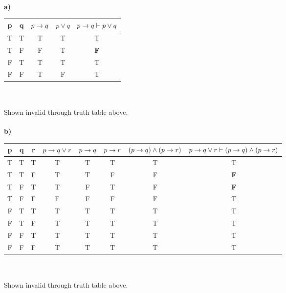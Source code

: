 \documentclass[12pt,oneside,reqno]{amsart}
\begin{document}
\textbf{a)}\\
	\begin{tabular}{ cc|c|c|c }
		p & q & $p \rightarrow{} q$ & $p \lor q$ & $p \rightarrow{} q \vdash p \lor q$ \\ \hline
		T & T & 	T & T & T \\
		T & F & 	F & T & \textbf{F} \\
		F & T & 	T & T & T \\
		F & F & 	T & F & T \\
	\end{tabular}\\\\
	Shown invalid through truth table above.\\\\

\textbf{b)}\\
	\begin{tabular}{ ccc|c|c|c|c|c }
		p & q & r & $p \rightarrow{} q \lor r$ & $p \rightarrow{} q$ & $p \rightarrow{} r$ & $(p \rightarrow{} q) \land (p \rightarrow{} r)$ & $p \rightarrow{} q \lor r \vdash (p \rightarrow{} q) \land (p \rightarrow{} r)$  \\ \hline
		T & T & T &	 T & T & T & T & T \\
		T & T & F &	 T & T & F & F & \textbf{F} \\
		T & F & T &	 T & F & T & F & \textbf{F} \\
		T & F & F &	 F & F & F & F & T \\
		F & T & T &	 T & T & T & T & T \\
		F & T & F &	 T & T & T & T & T \\
		F & F & T &	 T & T & T & T & T \\
		F & F & F &	 T & T & T & T & T \\
	\end{tabular}\\\\
	Shown invalid through truth table above.\\\\
\end{document}
